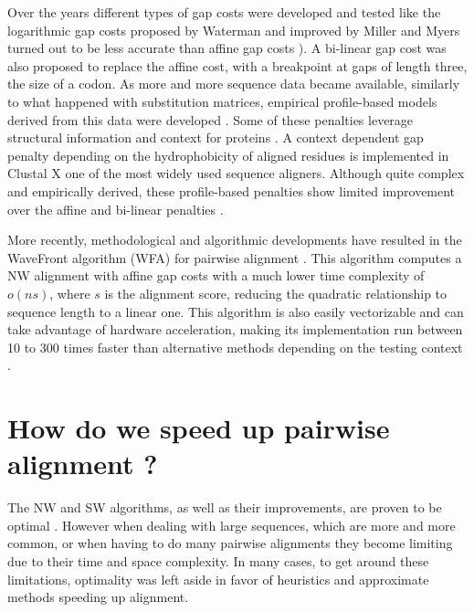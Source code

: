 \documentclass[
  11pt,
  twoside,
  BCOR=10mm,
  listof=totoc]{scrbook}
\begin{document}
Over the years different types of gap costs were developed and tested like the logarithmic gap costs proposed by Waterman \autocite{watermanEfficientSequenceAlignment1984} and improved by Miller and Myers \autocite{millerSequenceComparisonConcave1988} turned out to be less accurate than affine gap costs \autocite{cartwrightLogarithmicGapCosts2006}). A bi-linear gap cost was also proposed to replace the affine cost\autocite{goonesekereFrequencyGapsObserved2004}, with a breakpoint at gaps of length three, the size of a codon. As more and more sequence data became available, similarly to what happened with substitution matrices, empirical profile-based models derived from this data were developed \autocite{bennerEmpiricalStructuralModels1993}. Some of these penalties leverage structural information and context for proteins \autocite{wrablGapsStructurallySimilar2004,zhangSP5ImprovingProtein2008}. A context dependent gap penalty depending on the hydrophobicity of aligned residues is implemented in Clustal X \autocite{jeanmouginMultipleSequenceAlignment1998} one of the most widely used sequence aligners. Although quite complex and empirically derived, these profile-based penalties show limited improvement over the affine and bi-linear penalties \autocite{wangComparisonLinearGap2011}.

More recently, methodological and algorithmic developments have resulted in the WaveFront algorithm (WFA) for pairwise alignment \autocite{marco-solaFastGapaffinePairwise2020}. This algorithm computes a NW alignment with affine gap costs with a much lower time complexity of \(o(ns)\), where \(s\) is the alignment score, reducing the quadratic relationship to sequence length to a linear one. This algorithm is also easily vectorizable and can take advantage of hardware acceleration, making its implementation run between 10 to 300 times faster than alternative methods depending on the testing context \autocite{marco-solaFastGapaffinePairwise2020}.

\hypertarget{how-do-we-speed-up-pairwise-alignment}{%
\section{How do we speed up pairwise alignment ?}\label{how-do-we-speed-up-pairwise-alignment}}

The NW and SW algorithms, as well as their improvements, are proven to be optimal \autocite{pearson27DynamicProgramming1992}. However when dealing with large sequences, which are more and more common, or when having to do many pairwise alignments they become limiting due to their time and space complexity. In many cases, to get around these limitations, optimality was left aside in favor of heuristics and approximate methods speeding up alignment.
\end{document}
